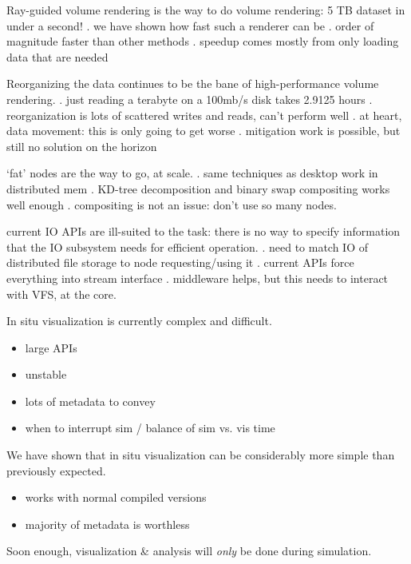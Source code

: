 Ray-guided volume rendering is the way to do volume rendering: 5 TB
dataset in under a second!
	. we have shown how fast such a renderer can be
	. order of magnitude faster than other methods
	. speedup comes mostly from only loading data that are needed

Reorganizing the data continues to be the bane of high-performance
volume rendering.
	. just reading a terabyte on a 100mb/s disk takes 2.9125 hours
	. reorganization is lots of scattered writes and reads, can't perform well
	. at heart, data movement: this is only going to get worse
	. mitigation work is possible, but still no solution on the horizon

`fat' nodes are the way to go, at scale.
	. same techniques as desktop work in distributed mem
	. KD-tree decomposition and binary swap compositing works well enough
	. compositing is not an issue: don't use so many nodes.




current IO APIs are ill-suited to the task: there is no way to specify
information that the IO subsystem needs for efficient operation.
	. need to match IO of distributed file storage to node requesting/using it
	. current APIs force everything into stream interface
	. middleware helps, but this needs to interact with VFS, at the core.

In situ visualization is currently complex and difficult.
\begin{itemize}
	\item large APIs
	\item unstable
	\item lots of metadata to convey
	\item when to interrupt sim / balance of sim vs. vis time
\end{itemize}

We have shown that in situ visualization can be considerably more
simple than previously expected.
\begin{itemize}
	\item works with normal compiled versions
	\item majority of metadata is worthless
\end{itemize}

Soon enough, visualization \& analysis will \emph{only} be done during
simulation.
